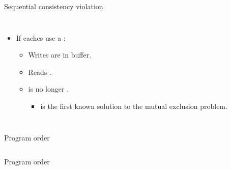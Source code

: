 \begin{frame}[t]{Sequential consistency violation}
\begin{columns}[T]

\makebox[\textwidth][c]{}

\pause 

\begin{itemize}
  \item If caches use a :
    \begin{itemize}
      \item Writes are  in buffer.
      \item Reads .
      \item {} is no longer .
        \begin{itemize}
          \item {} is the first known solution
                to the mutual exclusion problem.
        \end{itemize}
    \end{itemize}
\end{itemize}

\end{columns}
\end{frame}

\begin{frame}[t]{Program order}
\begin{columns}[T]

\makebox[\textwidth][c]{}

\makebox[\textwidth][c]{}

\end{columns}
\end{frame}

\begin{frame}[t]{Program order}
\begin{columns}[T]

\makebox[\textwidth][c]{}

\makebox[\textwidth][c]{}

\end{columns}
\end{frame}

